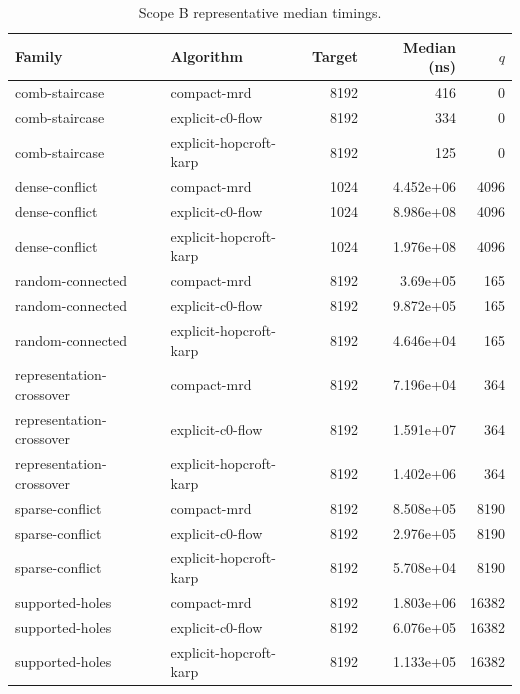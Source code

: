 \begin{table}[t]
\caption{Scope B representative median timings.}
\label{tab:kernel-scope-b}
\begin{tabular}{llrrr}
\toprule
Family & Algorithm & Target & Median (ns) & $q$ \\
\midrule
comb-staircase & compact-mrd & 8192 & 416 & 0 \\
comb-staircase & explicit-c0-flow & 8192 & 334 & 0 \\
comb-staircase & explicit-hopcroft-karp & 8192 & 125 & 0 \\
dense-conflict & compact-mrd & 1024 & 4.452e+06 & 4096 \\
dense-conflict & explicit-c0-flow & 1024 & 8.986e+08 & 4096 \\
dense-conflict & explicit-hopcroft-karp & 1024 & 1.976e+08 & 4096 \\
random-connected & compact-mrd & 8192 & 3.69e+05 & 165 \\
random-connected & explicit-c0-flow & 8192 & 9.872e+05 & 165 \\
random-connected & explicit-hopcroft-karp & 8192 & 4.646e+04 & 165 \\
representation-crossover & compact-mrd & 8192 & 7.196e+04 & 364 \\
representation-crossover & explicit-c0-flow & 8192 & 1.591e+07 & 364 \\
representation-crossover & explicit-hopcroft-karp & 8192 & 1.402e+06 & 364 \\
sparse-conflict & compact-mrd & 8192 & 8.508e+05 & 8190 \\
sparse-conflict & explicit-c0-flow & 8192 & 2.976e+05 & 8190 \\
sparse-conflict & explicit-hopcroft-karp & 8192 & 5.708e+04 & 8190 \\
supported-holes & compact-mrd & 8192 & 1.803e+06 & 16382 \\
supported-holes & explicit-c0-flow & 8192 & 6.076e+05 & 16382 \\
supported-holes & explicit-hopcroft-karp & 8192 & 1.133e+05 & 16382 \\
\bottomrule
\end{tabular}
\end{table}

